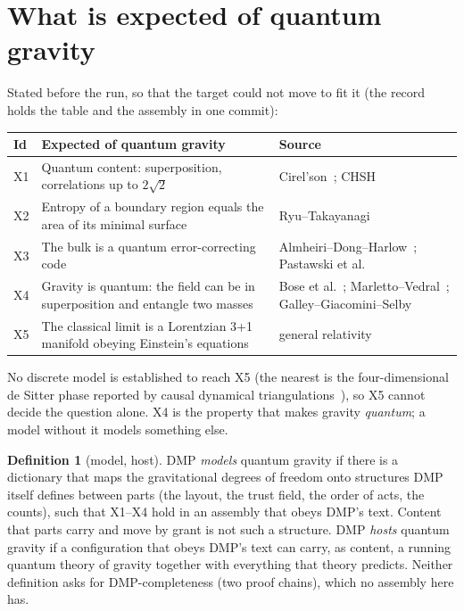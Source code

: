 \documentclass[11pt,a4paper]{article}
\theoremstyle{definition}
\newtheorem{definition}{Definition}
\theoremstyle{remark}
\begin{document}
\section{What is expected of quantum gravity}\label{sec:expect}

Stated before the run, so that the target could not move to fit it (the record holds the table and the assembly in one commit):

\begin{center}\small
\begin{tabularx}{\linewidth}{@{}lLL@{}}
\toprule
Id & Expected of quantum gravity & Source \\
\midrule
X1 & Quantum content: superposition, correlations up to $2\sqrt2$ & Cirel'son~\cite{cirelson}; CHSH~\cite{chsh} \\
X2 & Entropy of a boundary region equals the area of its minimal surface & Ryu--Takayanagi~\cite{rt} \\
X3 & The bulk is a quantum error-correcting code & Almheiri--Dong--Harlow~\cite{adh}; Pastawski et al.~\cite{happy} \\
X4 & Gravity is quantum: the field can be in superposition and entangle two masses & Bose et al.~\cite{bose}; Marletto--Vedral~\cite{mv}; Galley--Giacomini--Selby~\cite{ggs} \\
X5 & The classical limit is a Lorentzian 3+1 manifold obeying Einstein's equations & general relativity \\
\bottomrule
\end{tabularx}
\end{center}

\noindent No discrete model is established to reach X5 (the nearest is the four-dimensional de Sitter phase reported by causal dynamical
triangulations~\cite{cdt}), so X5 cannot decide the question alone. X4 is the property that makes gravity
\emph{quantum}; a model without it models something else.

\begin{definition}[model, host]\label{def:model}
DMP \emph{models} quantum gravity if there is a dictionary that maps the gravitational degrees of freedom onto structures DMP itself
defines between parts (the layout, the trust field, the order of acts, the counts), such that X1--X4 hold in an assembly that obeys DMP's text.
Content that parts carry and move by grant is not such a structure. DMP \emph{hosts} quantum gravity if a configuration that obeys DMP's
text can carry, as content, a running quantum theory of gravity together with everything that theory predicts. Neither definition asks
for DMP-completeness (two proof chains), which no assembly here has.
\end{definition}
\end{document}
